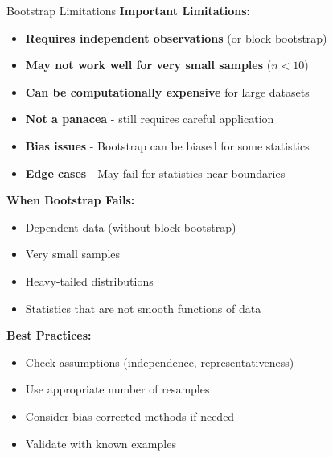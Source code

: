 \documentclass[aspectratio=169]{beamer}
\begin{document}
\begin{frame}{Bootstrap Limitations}
\scriptsize
\textbf{Important Limitations:}
\begin{itemize}
    \item \textbf{Requires independent observations} (or block bootstrap)
    \item \textbf{May not work well for very small samples} ($n < 10$)
    \item \textbf{Can be computationally expensive} for large datasets
    \item \textbf{Not a panacea} - still requires careful application
    \item \textbf{Bias issues} - Bootstrap can be biased for some statistics
    \item \textbf{Edge cases} - May fail for statistics near boundaries
\end{itemize}

\vspace{0.05cm}
\textbf{When Bootstrap Fails:}
\begin{itemize}
    \item Dependent data (without block bootstrap)
    \item Very small samples
    \item Heavy-tailed distributions
    \item Statistics that are not smooth functions of data
\end{itemize}

\vspace{0.05cm}
\textbf{Best Practices:}
\begin{itemize}
    \item Check assumptions (independence, representativeness)
    \item Use appropriate number of resamples
    \item Consider bias-corrected methods if needed
    \item Validate with known examples
\end{itemize}
\end{frame}
\end{document}
